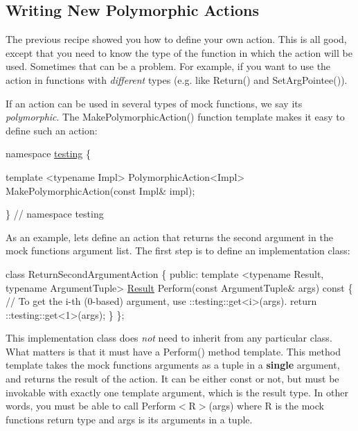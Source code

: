 \subsection*{Writing New Polymorphic Actions}

The previous recipe showed you how to define your own action. This is all good, except that you need to know the type of the function in which the action will be used. Sometimes that can be a problem. For example, if you want to use the action in functions with {\itshape different} types (e.\+g. like {\ttfamily Return()} and {\ttfamily Set\+Arg\+Pointee()}).

If an action can be used in several types of mock functions, we say it\textquotesingle{}s {\itshape polymorphic}. The {\ttfamily Make\+Polymorphic\+Action()} function template makes it easy to define such an action\+:


\begin{DoxyCode}
\textcolor{keyword}{namespace }\hyperlink{namespacetesting}{testing} \{

\textcolor{keyword}{template} <\textcolor{keyword}{typename} Impl>
PolymorphicAction<Impl> MakePolymorphicAction(\textcolor{keyword}{const} Impl& impl);

\}  \textcolor{comment}{// namespace testing}
\end{DoxyCode}


As an example, let\textquotesingle{}s define an action that returns the second argument in the mock function\textquotesingle{}s argument list. The first step is to define an implementation class\+:


\begin{DoxyCode}
\textcolor{keyword}{class }ReturnSecondArgumentAction \{
 \textcolor{keyword}{public}:
  \textcolor{keyword}{template} <\textcolor{keyword}{typename} Result, \textcolor{keyword}{typename} ArgumentTuple>
  \hyperlink{classResult}{Result} Perform(\textcolor{keyword}{const} ArgumentTuple& args)\textcolor{keyword}{ const }\{
    \textcolor{comment}{// To get the i-th (0-based) argument, use ::testing::get<i>(args).}
    return ::testing::get<1>(args);
  \}
\};
\end{DoxyCode}


This implementation class does {\itshape not} need to inherit from any particular class. What matters is that it must have a {\ttfamily Perform()} method template. This method template takes the mock function\textquotesingle{}s arguments as a tuple in a {\bfseries single} argument, and returns the result of the action. It can be either {\ttfamily const} or not, but must be invokable with exactly one template argument, which is the result type. In other words, you must be able to call {\ttfamily Perform$<$R$>$(args)} where {\ttfamily R} is the mock function\textquotesingle{}s return type and {\ttfamily args} is its arguments in a tuple.

